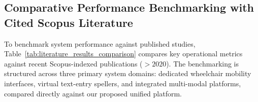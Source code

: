 \FloatBarrier
\subsection{Comparative Performance Benchmarking with Cited Scopus Literature}
\label{subsec:comparative_benchmarking_literature}

To benchmark system performance against published studies, Table~\ref{tab:literature_results_comparison} compares key operational metrics against recent Scopus-indexed publications ($>2020$). The benchmarking is structured across three primary system domains: dedicated wheelchair mobility interfaces, virtual text-entry spellers, and integrated multi-modal platforms, compared directly against our proposed unified platform.

